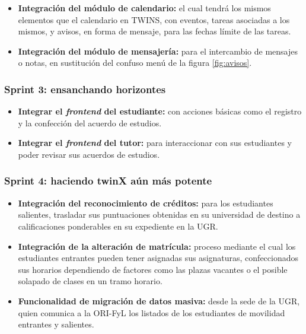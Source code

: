 \begin{itemize}
	\item \textbf{Integración del módulo de calendario:} el cual tendrá los mismos elementos que el calendario en TWINS, con eventos, tareas asociadas a los mismos, y avisos, en forma de mensaje, para las fechas límite de las tareas.
	\item \textbf{Integración del módulo de mensajería:} para el intercambio de mensajes o notas, en sustitución del confuso menú de la figura \ref{fig:avisos}.
\end{itemize}

\subsubsection*{\textbf{Sprint 3: ensanchando horizontes}}

\begin{itemize}
	\item \textbf{Integrar el \textit{frontend} del estudiante:} con acciones básicas como el registro y la confección del acuerdo de estudios.
	\item \textbf{Integrar el \textit{frontend} del tutor:} para interaccionar con sus estudiantes y poder revisar sus acuerdos de estudios.
\end{itemize}

\subsubsection*{\textbf{Sprint 4: haciendo twinX aún más potente}}

\begin{itemize}
	\item \textbf{Integración del reconocimiento de créditos:} para los estudiantes salientes, trasladar sus puntuaciones obtenidas en su universidad de destino a calificaciones ponderables en su expediente en la UGR.
	\item \textbf{Integración de la alteración de matrícula:} proceso mediante el cual los estudiantes entrantes pueden tener asignadas sus asignaturas, confeccionados sus horarios dependiendo de factores como las plazas vacantes o el posible solapado de clases en un tramo horario.
	\item \textbf{Funcionalidad de migración de datos masiva:} desde la sede de la UGR, quien comunica a la ORI-FyL los listados de los estudiantes de movilidad entrantes y salientes.
\end{itemize}

